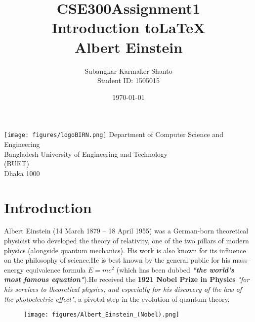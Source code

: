 \documentclass{book}
\title {CSE300\textunderscore Assignment1\\Introduction to\LaTeX\\Albert Einstein}
\author{Subangkar Karmaker Shanto\\Student ID: 1505015}
\date{}
\begin{document}
\begin{titlepage}
\maketitle
\begin{center}
\texttt{[image: figures/logoBIRN.png]}
Department of Computer Science and Engineering \\
Bangladesh University of Engineering and Technology\\
(BUET)\\
Dhaka 1000 \\
\date{\today}
\end{center}
\end{titlepage}
 
\newpage


\section{Introduction}

Albert Einstein (14 March 1879 – 18 April 1955) was a German-born theoretical physicist who developed the theory of relativity, one of the two pillars of modern physics (alongside quantum mechanics). His work is also known for its influence on the philosophy of science.He is best known by the general public for his mass–energy equivalence formula \textbf{$E = mc^2$} (which has been dubbed \textbf{\textit{"the world's most famous equation"}}).He received the \textbf{1921 Nobel Prize in Physics} \textit{"for his services to theoretical physics, and especially for his discovery of the law of the photoelectric effect"}, a pivotal step in the evolution of quantum theory.

\begin{figure}[h!]
    \texttt{[image: figures/Albert\_Einstein\_(Nobel).png]}
    \label{fig:einstein_ProPic}
\end{figure}{}
\end{document}
